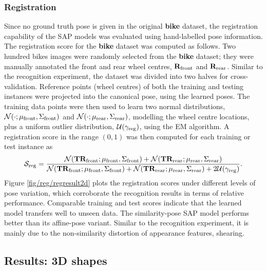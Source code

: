 \subsubsection{Registration} 
Since no ground truth pose is given in the original \textbf{bike} dataset, the registration capability of the SAP models was evaluated using hand-labelled pose information. 
The registration score for the \textbf{bike} dataset was computed as follows.
Two hundred bikes images were randomly selected from the \textbf{bike} dataset; they were manually annotated the front and rear wheel centres, $\mathbf{R}_\mathrm{front}$ and $\mathbf{R}_\mathrm{rear}$.
Similar to the recognition experiment, the dataset was divided into two halves for cross-validation. 
Reference points (wheel centres) of both the training and testing instances were projected into the canonical pose, using the learned poses. The training data points were then used to learn two normal distributions, $\mathcal{N}(\cdot;\mu_\mathrm{front},\Sigma_\mathrm{front})$ and $\mathcal{N}(\cdot;\mu_\mathrm{rear},\Sigma_\mathrm{rear})$, modelling the wheel centre locations, plus a uniform outlier distribution, $\mathcal{U}(\gamma_\mathrm{reg})$, using the EM algorithm. A registration score in the range $(0,1)$ was then computed for each training or test instance as
\begin{equation}
	\mathcal{S}_\mathrm{reg} = \frac{\mathcal{N}(\mathbf{T}\mathbf{R}_\mathrm{front}; \mu_\mathrm{front},\Sigma_\mathrm{front}) + \mathcal{N}(\mathbf{T}\mathbf{R}_\mathrm{rear}; \mu_\mathrm{rear},\Sigma_\mathrm{rear})}{\mathcal{N}(\mathbf{T}\mathbf{R}_\mathrm{front}; \mu_\mathrm{front},\Sigma_\mathrm{front}) + \mathcal{N}(\mathbf{T}\mathbf{R}_\mathrm{rear}; \mu_\mathrm{rear},\Sigma_\mathrm{rear}) + 2\mathcal{U}(\gamma_\mathrm{reg})}.
	\label{eqn/reg/reg2d_score}
\end{equation}
Figure \ref{fig/reg/regresult2d} plots the registration scores under different levels of pose variation, which corroborate the recognition results in terms of relative performance. 
Comparable training and test scores indicate that the learned model transfers well to unseen data. The similarity-pose SAP model performs better than its affine-pose variant. Similar to the recognition experiment, it is mainly due to the non-similarity distortion of appearance features, \eg shearing. 

\subsection{Results: 3D shapes}

